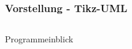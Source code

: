 \documentclass[xcolor=dvipsnames]{beamer}
\begin{document}
\begin{frame}
	\frametitle{Vorstellung  - Tikz-UML}
	\begin{columns}
		
		\begin{column}{0.35\textwidth}
			\begin{block}{Programmeinblick}
			
				
			\end{block}
		\end{column}
		
		
		\begin{column}{0.75\textwidth}
			\begin{minipage}{\textwidth}
				
				
			\end{minipage}
		\end{column}
		
	\end{columns}
\end{frame}
\end{document}
